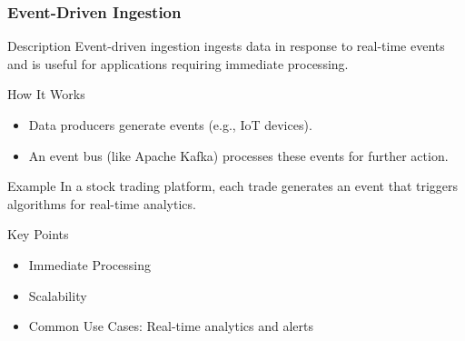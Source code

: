 \documentclass{beamer}
\begin{document}
\begin{frame}[fragile]
    \frametitle{Event-Driven Ingestion}
    \begin{block}{Description}
        Event-driven ingestion ingests data in response to real-time events and is useful for applications requiring immediate processing.
    \end{block}
    
    \begin{block}{How It Works}
        \begin{itemize}
            \item Data producers generate events (e.g., IoT devices).
            \item An event bus (like Apache Kafka) processes these events for further action.
        \end{itemize}
    \end{block}

    \begin{block}{Example}
        In a stock trading platform, each trade generates an event that triggers algorithms for real-time analytics.
    \end{block}
    
    \begin{block}{Key Points}
        \begin{itemize}
            \item Immediate Processing
            \item Scalability
            \item Common Use Cases: Real-time analytics and alerts
        \end{itemize}
    \end{block}
\end{frame}
\end{document}
